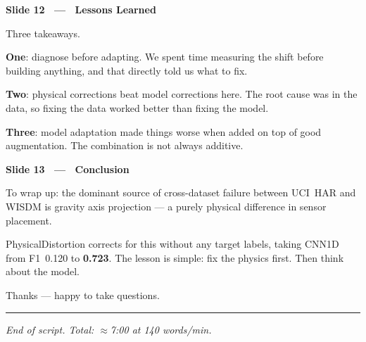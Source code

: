 \documentclass[12pt]{article}
\newcommand{\slidetitle}[1]{%
  \vspace{14pt}%
  \noindent\colorbox{pennblue}{\parbox{\dimexpr\textwidth-2\fboxsep\relax}{%
    \strut\bfseries\color{white}\quad #1\strut}}%
  \vspace{4pt}\par
}
\newcommand{\timing}[1]{%
  \noindent{\small\bfseries\color{pennred}#1}\quad\par\vspace{2pt}%
}
\begin{document}
\slidetitle{Slide 12 \ — \ Lessons Learned}
\timing{[6:20 – 6:45]}

Three takeaways.

\textbf{One}: diagnose before adapting. We spent time measuring the shift
before building anything, and that directly told us what to fix.

\textbf{Two}: physical corrections beat model corrections here. The root cause
was in the data, so fixing the data worked better than fixing the model.

\textbf{Three}: model adaptation made things worse when added on top of good
augmentation. The combination is not always additive.

\slidetitle{Slide 13 \ — \ Conclusion}
\timing{[6:45 – 7:00]}

To wrap up: the dominant source of cross-dataset failure between UCI~HAR and
WISDM is gravity axis projection --- a purely physical difference in sensor
placement.

PhysicalDistortion corrects for this without any target labels, taking CNN1D
from F1~0.120 to \textbf{0.723}. The lesson is simple: fix the physics first.
Then think about the model.

Thanks --- happy to take questions.

\vspace{12pt}
\textcolor{pennred}{\rule{\textwidth}{1.5pt}}
\begin{center}
\small\color{gray}
\textit{End of script. Total: $\approx$7:00 at 140 words/min.}
\end{center}
\end{document}
